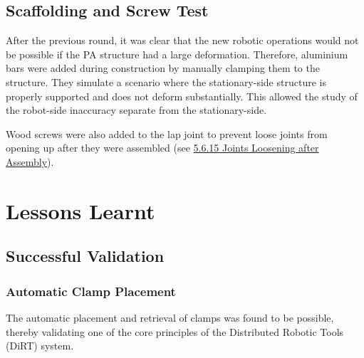 


\subsection{Scaffolding and Screw Test}
\label{subsection:exploration_3_scaffolding_and_screw_test}

After the previous round, it was clear that the new robotic operations would not be possible if the PA structure had a large deformation. Therefore, aluminium bars were added during construction by manually clamping them to the structure. They simulate a scenario where the stationary-side structure is properly supported and does not deform substantially. This allowed the study of the robot-side inaccuracy separate from the stationary-side.




Wood screws were also added to the lap joint to prevent loose joints from opening up after they were assembled (see \ul{5.6.15 Joints Loosening after Assembly}). 

\section{Lessons Learnt}
\label{section:exploration_3_lessons_learnt}

\subsection{Successful Validation}
\label{subsection:exploration_3_successful_validation}

\subsubsection{Automatic Clamp Placement}
\label{subsubsection:exploration_3_automatic_clamp_placement}

The automatic placement and retrieval of clamps was found to be possible, thereby validating one of the core principles of the Distributed Robotic Tools (DiRT) system. 

